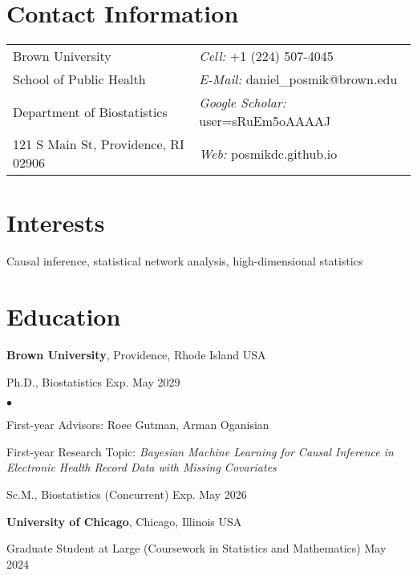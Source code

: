 \documentclass[margin,line]{res}
\newenvironment{list1}{
  \begin{list}{\ding{113}}{%
      \setlength{\itemsep}{0in}
      \setlength{\parsep}{0in} \setlength{\parskip}{0in}
      \setlength{\topsep}{0in} \setlength{\partopsep}{0in} 
      \setlength{\leftmargin}{0.17in}}}{\end{list}}
\newenvironment{list2}{
  \begin{list}{$\bullet$}{%
      \setlength{\itemsep}{0in}
      \setlength{\parsep}{0in} \setlength{\parskip}{0in}
      \setlength{\topsep}{0in} \setlength{\partopsep}{0in} 
      \setlength{\leftmargin}{0.2in}}}{\end{list}}
\begin{document}

\begin{resume}
\section{\sc Contact Information}
\vspace{.05in}
\begin{tabular}{@{}p{3in}p{4in}}
Brown University & {\it Cell:} +1 (224) 507-4045 \\            
School of Public Health & {\it E-Mail:} {daniel\_posmik@brown.edu} \\    
Department of Biostatistics & {\it Google Scholar:} user=sRuEm5oAAAAJ \\
121 S Main St, Providence, RI 02906 & {\it Web:} posmikdc.github.io \\       
\end{tabular}


\section{\sc Interests}
Causal inference, statistical network analysis, high-dimensional statistics

\section{\sc Education}
{\bf Brown University}, Providence, Rhode Island USA\\
\vspace*{-.1in}
\begin{list1}
  \item[] Ph.D., Biostatistics \hfill Exp. May 2029

\begin{list2}
\vspace*{.05in}
\item First-year Advisors: Roee Gutman, Arman Oganisian
\item First-year Research Topic: {\em Bayesian Machine Learning for Causal Inference in Electronic Health Record Data with Missing Covariates}
\end{list2}
\vspace*{.05in}
\item[] Sc.M., Biostatistics (Concurrent) \hfill Exp. May 2026
\end{list1}

{\bf University of Chicago}, Chicago, Illinois USA\\
\vspace*{-.1in}
\begin{list1}
\item[] Graduate Student at Large (Coursework in Statistics and Mathematics) \hfill May 2024
\end{list1}


\end{resume}
\end{document}
